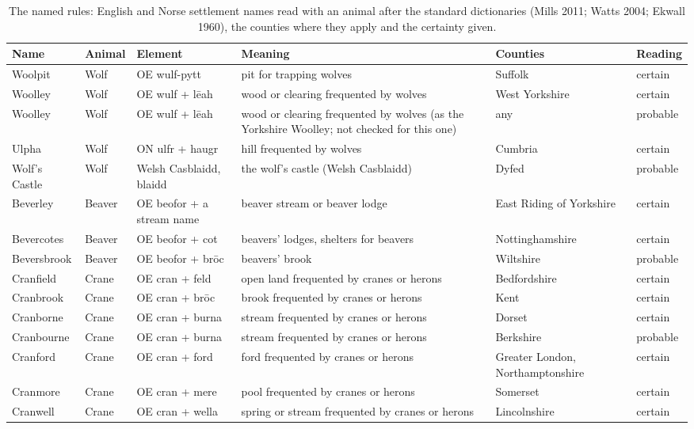 \documentclass[11pt,a4paper]{article}
\begin{document}
\begin{small}\begin{longtable}{R{2.2cm}R{1.3cm}R{2.6cm}R{3.7cm}R{2.7cm}l}\caption{The named rules: English and Norse settlement names read with an animal after the standard dictionaries (Mills 2011; Watts 2004; Ekwall 1960), the counties where they apply and the certainty given.}\label{tab:named}\\\toprule Name & Animal & Element & Meaning & Counties & Reading\\\midrule\endhead
Woolpit & Wolf & OE wulf-pytt & pit for trapping wolves & Suffolk & certain\\
Woolley & Wolf & OE wulf + lēah & wood or clearing frequented by wolves & West Yorkshire & certain\\
Woolley & Wolf & OE wulf + lēah & wood or clearing frequented by wolves (as the Yorkshire Woolley; not checked for this one) & any & probable\\
Ulpha & Wolf & ON ulfr + haugr & hill frequented by wolves & Cumbria & certain\\
Wolf's Castle & Wolf & Welsh Casblaidd, blaidd & the wolf's castle (Welsh Casblaidd) & Dyfed & probable\\
Beverley & Beaver & OE beofor + a stream name & beaver stream or beaver lodge & East Riding of Yorkshire & certain\\
Bevercotes & Beaver & OE beofor + cot & beavers' lodges, shelters for beavers & Nottinghamshire & certain\\
Beversbrook & Beaver & OE beofor + brōc & beavers' brook & Wiltshire & probable\\
Cranfield & Crane & OE cran + feld & open land frequented by cranes or herons & Bedfordshire & certain\\
Cranbrook & Crane & OE cran + brōc & brook frequented by cranes or herons & Kent & certain\\
Cranborne & Crane & OE cran + burna & stream frequented by cranes or herons & Dorset & certain\\
Cranbourne & Crane & OE cran + burna & stream frequented by cranes or herons & Berkshire & probable\\
Cranford & Crane & OE cran + ford & ford frequented by cranes or herons & Greater London, Northamptonshire & certain\\
Cranmore & Crane & OE cran + mere & pool frequented by cranes or herons & Somerset & certain\\
Cranwell & Crane & OE cran + wella & spring or stream frequented by cranes or herons & Lincolnshire & certain\\

\end{longtable}
\end{small}
\end{document}
